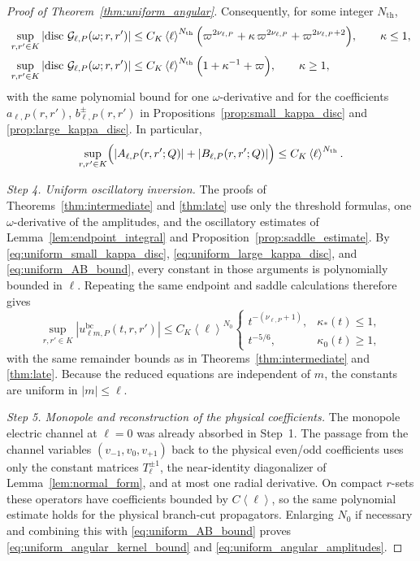 \documentclass[10pt,a4paper]{amsart}
\newcommand{\abs}[1]{\left|#1\right|}
\newcommand{\angles}[1]{\left\langle #1 \right\rangle}
\newcommand{\bc}{\mathrm{bc}}
\newcommand{\cG}{\mathcal G}
\newcommand{\disc}{\operatorname{disc}}
\newcommand{\kap}{\kappa}
\newcommand{\om}{\omega}
\newcommand{\vp}{\varpi}
\begin{document}
\begin{proof}[Proof of Theorem~\ref{thm:uniform_angular}]
Consequently, for some integer $N_{\mathrm{th}}$,
\begin{align}
   \sup_{r,r'\in K}
   \abs{\disc\,\cG_{\ell,P}(\om;r,r')}
   &\le
   C_K\angles{\ell}^{N_{\mathrm{th}}}
   \Bigl(
      \vp^{2\nu_{\ell,P}}
      +\kap\,\vp^{2\nu_{\ell,P}}
      +\vp^{2\nu_{\ell,P}+2}
   \Bigr),
   \qquad \kap\le1,
   \label{eq:uniform_small_kappa_disc}
   \\
   \sup_{r,r'\in K}
   \abs{\disc\,\cG_{\ell,P}(\om;r,r')}
   &\le
   C_K\angles{\ell}^{N_{\mathrm{th}}}
   \Bigl(
      1+\kap^{-1}+\vp
   \Bigr),
   \qquad \kap\ge1,
   \label{eq:uniform_large_kappa_disc}
\end{align}
with the same polynomial bound for one $\om$-derivative and for the coefficients $a_{\ell,P}(r,r')$, $b_{\ell,P}^\pm(r,r')$ in Propositions~\ref{prop:small_kappa_disc} and \ref{prop:large_kappa_disc}.  In particular,
\begin{equation}\label{eq:uniform_AB_bound}
   \sup_{r,r'\in K}
   \Bigl(
      \abs{A_{\ell,P}(r,r';Q)}
      +
      \abs{B_{\ell,P}(r,r';Q)}
   \Bigr)
   \le C_K\angles{\ell}^{N_{\mathrm{th}}}.
\end{equation}

\smallskip
\noindent\textit{Step 4. Uniform oscillatory inversion.}
The proofs of Theorems~\ref{thm:intermediate} and \ref{thm:late} use only the threshold formulas, one $\om$-derivative of the amplitudes, and the oscillatory estimates of Lemma~\ref{lem:endpoint_integral} and Proposition~\ref{prop:saddle_estimate}.  By \eqref{eq:uniform_small_kappa_disc}, \eqref{eq:uniform_large_kappa_disc}, and \eqref{eq:uniform_AB_bound}, every constant in those arguments is polynomially bounded in $\ell$.  Repeating the same endpoint and saddle calculations therefore gives
\[
   \sup_{r,r'\in K}\abs{u_{\ell m,P}^{\bc}(t,r,r')}
   \le
   C_K\angles{\ell}^{N_0}
   \begin{cases}
      t^{-(\nu_{\ell,P}+1)}, & \kap_*(t)\le1,\\[0.5ex]
      t^{-5/6}, & \kap_0(t)\ge1,
   \end{cases}
\]
with the same remainder bounds as in Theorems~\ref{thm:intermediate} and \ref{thm:late}.  Because the reduced equations are independent of $m$, the constants are uniform in $\abs{m}\le\ell$.

\smallskip
\noindent\textit{Step 5. Monopole and reconstruction of the physical coefficients.}
The monopole electric channel at $\ell=0$ was already absorbed in Step~1.  The passage from the channel variables $(v_{-1},v_0,v_{+1})$ back to the physical even/odd coefficients uses only the constant matrices $T_\ell^{\pm1}$, the near-identity diagonalizer of Lemma~\ref{lem:normal_form}, and at most one radial derivative.  On compact $r$-sets these operators have coefficients bounded by $C\angles{\ell}$, so the same polynomial estimate holds for the physical branch-cut propagators.  Enlarging $N_0$ if necessary and combining this with \eqref{eq:uniform_AB_bound} proves \eqref{eq:uniform_angular_kernel_bound} and \eqref{eq:uniform_angular_amplitudes}.
\end{proof}
\end{document}
